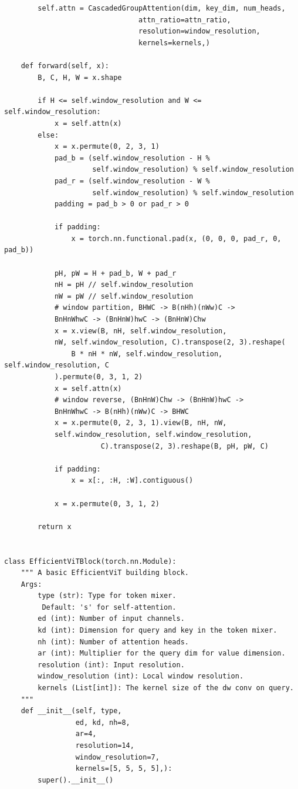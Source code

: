 \documentclass[12pt]{ctexart}
\begin{document}
\begin{lstlisting}
        self.attn = CascadedGroupAttention(dim, key_dim, num_heads,
                                attn_ratio=attn_ratio, 
                                resolution=window_resolution,
                                kernels=kernels,)
 
    def forward(self, x):
        B, C, H, W = x.shape
               
        if H <= self.window_resolution and W <= self.window_resolution:
            x = self.attn(x)
        else:
            x = x.permute(0, 2, 3, 1)
            pad_b = (self.window_resolution - H %
                     self.window_resolution) % self.window_resolution
            pad_r = (self.window_resolution - W %
                     self.window_resolution) % self.window_resolution
            padding = pad_b > 0 or pad_r > 0
 
            if padding:
                x = torch.nn.functional.pad(x, (0, 0, 0, pad_r, 0, pad_b))
 
            pH, pW = H + pad_b, W + pad_r
            nH = pH // self.window_resolution
            nW = pW // self.window_resolution
            # window partition, BHWC -> B(nHh)(nWw)C -> 
            BnHnWhwC -> (BnHnW)hwC -> (BnHnW)Chw
            x = x.view(B, nH, self.window_resolution, 
            nW, self.window_resolution, C).transpose(2, 3).reshape(
                B * nH * nW, self.window_resolution, self.window_resolution, C
            ).permute(0, 3, 1, 2)
            x = self.attn(x)
            # window reverse, (BnHnW)Chw -> (BnHnW)hwC -> 
            BnHnWhwC -> B(nHh)(nWw)C -> BHWC
            x = x.permute(0, 2, 3, 1).view(B, nH, nW, 
            self.window_resolution, self.window_resolution,
                       C).transpose(2, 3).reshape(B, pH, pW, C)
 
            if padding:
                x = x[:, :H, :W].contiguous()
 
            x = x.permute(0, 3, 1, 2)
 
        return x
 
 
class EfficientViTBlock(torch.nn.Module):
    """ A basic EfficientViT building block.
    Args:
        type (str): Type for token mixer.
         Default: 's' for self-attention.
        ed (int): Number of input channels.
        kd (int): Dimension for query and key in the token mixer.
        nh (int): Number of attention heads.
        ar (int): Multiplier for the query dim for value dimension.
        resolution (int): Input resolution.
        window_resolution (int): Local window resolution.
        kernels (List[int]): The kernel size of the dw conv on query.
    """
    def __init__(self, type,
                 ed, kd, nh=8,
                 ar=4,
                 resolution=14,
                 window_resolution=7,
                 kernels=[5, 5, 5, 5],):
        super().__init__()
            

\end{lstlisting}
\end{document}
